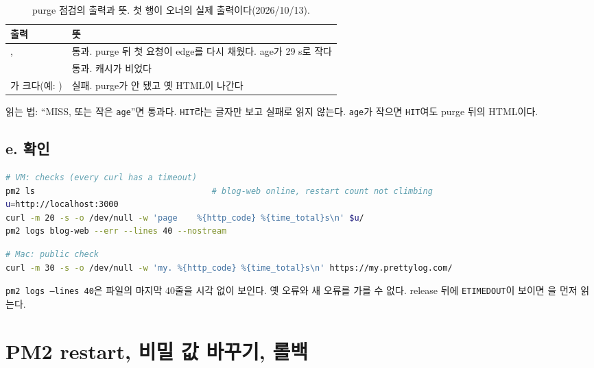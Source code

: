 \begin{table}[H]
  \caption{purge 점검의 출력과 뜻. 첫 행이 오너의 실제 출력이다(2026/10/13).}
  \label{tab:A-web-purge-read}
  \centering\small
  \begin{tabularx}{\linewidth}{@{}L{4.6cm}Y@{}}
    \toprule
    출력 & 뜻 \\
    \midrule
    ,  & 통과. purge 뒤 첫 요청이 edge를 다시 채웠다. age가 29 s로 작다 \\
    \midrule
     & 통과. 캐시가 비었다 \\
    \midrule
    가 크다(예: ) & 실패. purge가 안 됐고 옛 HTML이 나간다 \\
    \bottomrule
  \end{tabularx}
\end{table}

읽는 법: ``MISS, 또는 작은 \texttt{age}''면 통과다.
\texttt{HIT}라는 글자만 보고 실패로 읽지 않는다. \texttt{age}가 작으면 \texttt{HIT}여도 purge 뒤의 HTML이다.

\subsection{e. 확인}\label{sec:A-web-check}

\begin{lstlisting}[language=bash]
# VM: checks (every curl has a timeout)
pm2 ls                                    # blog-web online, restart count not climbing
u=http://localhost:3000
curl -m 20 -s -o /dev/null -w 'page    %{http_code} %{time_total}s\n' $u/
pm2 logs blog-web --err --lines 40 --nostream
\end{lstlisting}

\begin{lstlisting}[language=bash]
# Mac: public check
curl -m 30 -s -o /dev/null -w 'my. %{http_code} %{time_total}s\n' https://my.prettylog.com/
\end{lstlisting}

\begin{callout}
\texttt{pm2 logs --lines 40}은 파일의 마지막 40줄을 시각 없이 보인다.
옛 오류와 새 오류를 가를 수 없다.
release 뒤에 \texttt{ETIMEDOUT}이 보이면 을 먼저 읽는다.
\end{callout}

\section{PM2 restart, 비밀 값 바꾸기, 롤백}\label{sec:A-pm2}

